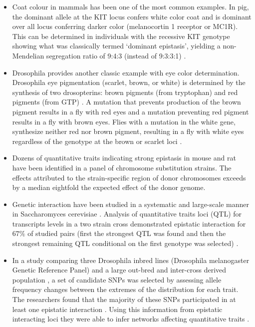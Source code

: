 \begin{itemize}

	\item Coat colour in mammals has been one of the most common examples. 
In pig, the dominant allele at the KIT locus confers white color coat and is dominant over all locus conferring darker color (melanocortin 1 receptor or MC1R). 
This can be determined in individuals with the recessive KIT genotype showing what was classically termed `dominant epistasis', 
yielding a non-Mendelian segregation ratio of 9:4:3 (instead of 9:3:3:1) \cite{carlborg2004epistasis, phillips2008epistasis}.

	\item Drosophila provides another classic example with eye color determination.
Drosophila eye pigmentation (scarlet, brown, or white) is determined by the synthesis of two drosopterins:  brown pigments (from tryptophan) and red pigments (from GTP) \cite{tyler2009shadows}.
A mutation that prevents production of the brown pigment results in a fly with red eyes and a mutation preventing red pigment results in a fly with brown eyes.
Flies with a mutation in the white gene, synthesize neither red nor brown pigment, resulting in a fly with white eyes regardless of the genotype at the brown or scarlet loci \cite{tyler2009shadows}.

	\item Dozens of quantitative traits indicating strong epistasis in mouse and rat \cite{shao2008genetic} have been identified in a panel of chromosome substitution strains. 
	The effects attributed to the strain-specific region of donor chromosomes exceeds by a median eightfold the expected effect of the donor genome.

	\item Genetic interaction have been studied in a systematic and large-scale manner in Saccharomyces cerevisiae \cite{jasnos2007epistatic, tong2001systematic}.
Analysis of quantitative traits loci (QTL) for transcripts levels in a two strain cross demonstrated epistatic interaction for $67\%$ of studied pairs (first the strongest QTL was found and then the strongest remaining QTL conditional on the first genotype was selected) \cite{brem2005genetic}. 

	\item In a study comparing three Drosophila inbred lines (Drosophila melanogaster Genetic Reference Panel) and a large out-bred and inter-cross derived  population \cite{huang2012epistasis}, a set of candidate SNPs was selected by assessing allele frequency changes between the extremes of the distribution for each trait. 
The researchers found that the majority of these SNPs participated in at least one epistatic interaction \cite{huang2012epistasis}.
Using this information from epistatic interacting loci they were able to infer networks affecting quantitative traits \cite{huang2012epistasis}.

\end{itemize}

